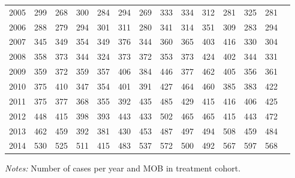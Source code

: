 \begin{table}[H]
\begin{threeparttable}
{\begin{tabular}{l*{13}{c}}
2005        &         299&         268&         300&         284&         294&         269&         333&         334&         312&         281&         325&         281\\
2006        &         288&         279&         294&         301&         311&         280&         341&         314&         351&         309&         283&         294\\
2007        &         345&         349&         354&         349&         376&         344&         360&         365&         403&         416&         330&         304\\
2008        &         358&         373&         344&         324&         373&         372&         353&         373&         424&         402&         344&         331\\
2009        &         359&         372&         359&         357&         406&         384&         446&         377&         462&         405&         356&         361\\
2010        &         375&         410&         347&         354&         401&         391&         427&         464&         460&         385&         383&         422\\
2011        &         375&         377&         368&         355&         392&         435&         485&         429&         415&         416&         406&         425\\
2012        &         448&         415&         398&         393&         443&         433&         502&         465&         465&         415&         443&         472\\
2013        &         462&         459&         392&         381&         430&         453&         487&         497&         494&         508&         459&         484\\
2014        &         530&         525&         511&         415&         483&         537&         572&         500&         492&         567&         597&         568\\
 \bottomrule \end{tabular} } \begin{tablenotes} \item \scriptsize \emph{Notes:} Number of cases per year and MOB in treatment cohort. \end{tablenotes} \end{threeparttable} \end{table} 
